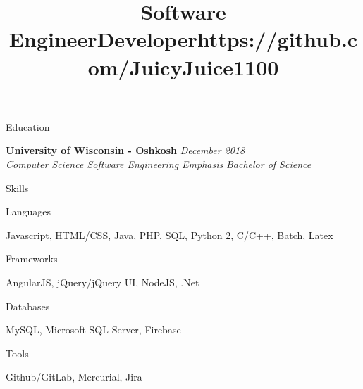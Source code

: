 \documentclass{resume} %
\title{Software Engineer} %
\title{Developer} %
\title{https://github.com/JuicyJuice1100}
\begin{document}

\begin{rSection}{Education}

{\bf University of Wisconsin - Oshkosh} \hfill {\em December 2018} \\
{\em Computer Science \seperator Software Engineering Emphasis} \hfill {\em Bachelor of Science}

\end{rSection}


\begin{rSection}{Skills}

    \begin{rSubsection}{Languages}{}{}{}
        \item Javascript, HTML/CSS, Java, PHP, SQL, Python 2, C/C++, Batch, Latex
    \end{rSubsection}

    \begin{rSubsection}{Frameworks}{}{}{}
        \item AngularJS, jQuery/jQuery UI, NodeJS, .Net
    \end{rSubsection}

    \begin{rSubsection}{Databases}{}{}{}
        \item MySQL, Microsoft SQL Server, Firebase
    \end{rSubsection}

    \begin{rSubsection}{Tools}{}{}{}
        \item Github/GitLab, Mercurial, Jira
    \end{rSubsection}
        


\end{rSection}
\end{document}
